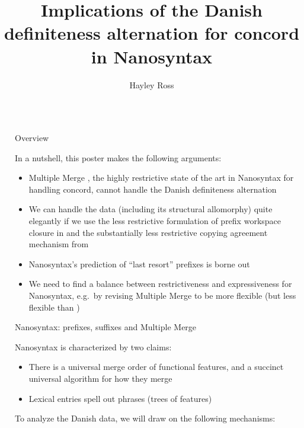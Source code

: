 \documentclass[final,20pt]{beamer}
\title{Implications of the Danish definiteness alternation for concord in Nanosyntax}
\author{Hayley Ross}
\institute[shortinst]{Harvard University}
\newlength{\sepwidth}
\newlength{\colwidth}
\newcommand{\separatorcolumn}{\begin{column}{\sepwidth}\end{column}}
\begin{document}
\begin{frame}[t]
\begin{columns}[t]
\separatorcolumn

\begin{column}{\colwidth}

\begin{alertblock}{Overview}

In a nutshell, this poster makes the following arguments:

\begin{itemize}
    \item Multiple Merge \citep{caha2019case}, the highly restrictive state of the art in Nanosyntax for handling concord, cannot handle the Danish definiteness alternation
    \item We can handle the data (including its structural allomorphy) quite elegantly if we use the less restrictive formulation of prefix workspace closure in \citet{starke2018complex} and the substantially less restrictive  copying agreement mechanism from \citet{taraldsen2010nanosyntax}
    \item Nanosyntax's prediction of “last resort” prefixes is borne out
    \item We need to find a balance between restrictiveness and expressiveness for Nanosyntax, e.g.~by revising Multiple Merge to be more flexible (but less flexible than \citealp{taraldsen2010nanosyntax})
\end{itemize}

\end{alertblock}

\begin{block}{Nanosyntax: prefixes, suffixes and Multiple Merge}
  
    Nanosyntax is characterized by two claims:

    \begin{itemize}
    \item There is a universal merge order of functional features, and a succinct universal algorithm for how they merge
    \item Lexical entries spell out phrases (trees of features)
    \end{itemize}
    
    To analyze the Danish data, we will draw on the following mechanisms:
    

\end{block}
\end{column}
\end{columns}
\end{frame}
\end{document}
